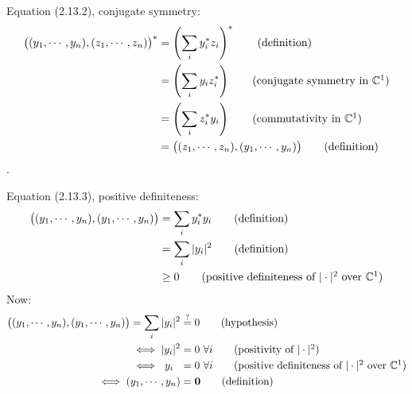 Equation (2.13.2), conjugate symmetry:
\begin{align}
	\bigl((y_1, \cdots, y_n), (z_1, \cdots, z_n)\bigr)^*
	&= \left(\sum_i y_i^* z_i \right)^* \tag{definition}\\
	&= \left(\sum_i y_i  z_i^* \right) \tag{conjugate symmetry in $\mathbb{C}^1$}\\
	&= \left(\sum_i z_i^* y_i \right) \tag{commutativity in $\mathbb{C}^1$}\\
	&= \bigl((z_1, \cdots, z_n) , (y_1, \cdots, y_n)\bigr) \tag{definition}
\end{align}.


Equation (2.13.3), positive definiteness:
\begin{align*}
	\bigl((y_1, \cdots, y_n), (y_1, \cdots, y_n)\bigr)
	&= \sum_i y_i^* y_i \tag{definition}\\
	&= \sum_i |y_i|^2 \tag{definition} \\
	&\geq 0 \tag{positive definiteness of $|\cdot|^2$ over $\mathbb{C}^1$}
\end{align*}
Now:
\begin{align*}
	\bigl((y_1, \cdots, y_n), (y_1, \cdots, y_n)\bigr) = \sum_i |y_i|^2 &\stackrel{?}{=} 0 \tag{hypothesis}\\ \iff |y_i|^2 &= 0\  \forall i \tag{positivity of $|\cdot|^2$}\\ \iff \ y_i\ \  &= 0\  \forall i \tag{positive definiteness of $|\cdot|^2$ over $\mathbb{C}^1$}\\ \iff (y_1, \cdots, y_n) &=  \textbf{0} \tag{definition}
\end{align*}

%
%

